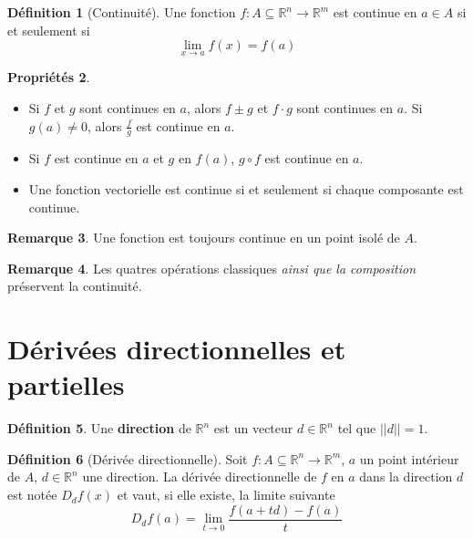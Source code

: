 \documentclass[11pt,a4paper]{article}
\theoremstyle{definition}
\newtheorem{mydef}{Définition}%
\newtheorem{myprop}[mydef]{Propriétés}
\newtheorem{myrem}[mydef]{Remarque}
\newcommand{\R}{\mathbb{R}}
\newcommand{\Rn}{\R^n}
\newcommand*\InsertTheoremBreak{%
	\begingroup %
		\setlength\itemsep{0pt}%
		\setlength\parsep{0pt}%
		\item[\vbox{\null}]%
	\endgroup%
}%
\begin{document}
\begin{mydef}[Continuité]
	Une fonction $f : A \subseteq \R^n \rightarrow \R^m$ est continue en $a \in A$ si et seulement si
	\[ \lim_{x \rightarrow a}f(x) = f(a) \]
\end{mydef}

\begin{myprop}\InsertTheoremBreak
	\begin{itemize}
		\item Si $f$ et $g$ sont continues en $a$, alors
			$f \pm g$ et $f \cdot g$ sont continues en $a$.
			Si $g(a) \neq 0$, alors $\frac{f}{g}$ est continue en $a$.

		\item Si $f$ est continue en $a$ et $g$ en $f(a)$,
			$g \circ f$ est continue en $a$.

		\item Une fonction vectorielle est continue si et seulement si chaque composante est continue.
	\end{itemize}
\end{myprop}

\begin{myrem}
	Une fonction est toujours continue en un point isolé de $A$.
\end{myrem}

\begin{myrem}
	Les quatres opérations classiques \emph{ainsi que la composition} préservent la continuité.
\end{myrem}



\section{Dérivées directionnelles et partielles}

\begin{mydef}
	Une \textbf{direction} de $\Rn$ est un vecteur $d \in \Rn$ tel que $||d|| = 1$.
\end{mydef}

\begin{mydef}[Dérivée directionnelle] Soit $f : A \subseteq \R^n \to \R^m$, $a$ un point intérieur de $A$, $d \in \R^n$ une direction. La dérivée directionnelle de $f$ en $a$ dans la direction $d$ est notée $D_df(x)$ et vaut, si elle existe, la limite suivante
	\[ D_df(a) = \lim_{t \to 0} \frac{f(a+td) - f(a)}{t} \]
\end{mydef}
\end{document}
